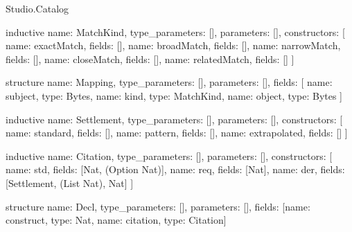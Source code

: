 \begin{lexlean}{Studio.Catalog}
\begin{semanticmodule}
inductive{
  name: MatchKind,
  type_parameters: [],
  parameters: [],
  constructors: [
    {name: exactMatch, fields: []},
    {name: broadMatch, fields: []},
    {name: narrowMatch, fields: []},
    {name: closeMatch, fields: []},
    {name: relatedMatch, fields: []}
  ]
}

structure{
  name: Mapping,
  type_parameters: [],
  parameters: [],
  fields: [
    {name: subject, type: Bytes},
    {name: kind, type: MatchKind},
    {name: object, type: Bytes}
  ]
}

inductive{
  name: Settlement,
  type_parameters: [],
  parameters: [],
  constructors: [
    {name: standard, fields: []},
    {name: pattern, fields: []},
    {name: extrapolated, fields: []}
  ]
}

inductive{
  name: Citation,
  type_parameters: [],
  parameters: [],
  constructors: [
    {name: std, fields: [Nat, (Option Nat)]},
    {name: req, fields: [Nat]},
    {name: der, fields: [Settlement, (List Nat), Nat]}
  ]
}

structure{
  name: Decl,
  type_parameters: [],
  parameters: [],
  fields: [{name: construct, type: Nat}, {name: citation, type: Citation}]
}
\end{semanticmodule}
\end{lexlean}
